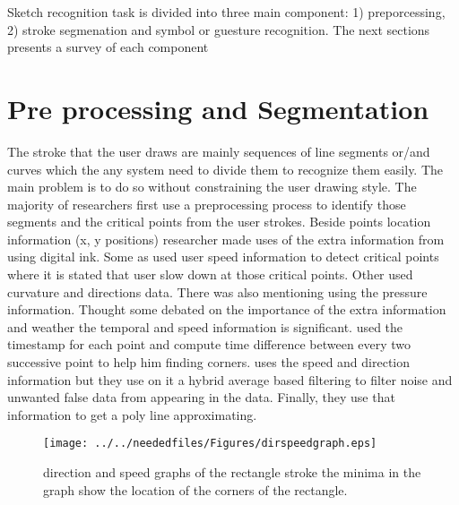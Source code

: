 
Sketch recognition task is divided into three main component: 1) preporcessing, 2) stroke segmenation and symbol or guesture recognition. The next sections presents a survey of each component
  

\section{Pre processing and Segmentation}
\label {sec:preprocessing}
 
The stroke that the user draws are mainly sequences of line segments or/and curves which the any system need to divide them to recognize them easily. The main problem is to do so without constraining the user drawing style. The majority of researchers first use a preprocessing process to identify those segments and the critical points from the user strokes.  
Beside points location information (x, y positions) researcher made uses of the extra information from using digital ink. Some as \cite {mulitstroke5,polygonfeedback31}  used user speed information to detect critical points where it is stated that user slow down at those critical points. Other used curvature and directions data. There was also mentioning using the pressure information.  Thought some \cite {MilitaryCOA37,computationalmodel16,polygonfeedback31}  debated on the importance of the extra information and weather the temporal and speed information is significant.  \cite{polygonfeedback31}  used the timestamp for each point and compute time difference between every two successive point to help him finding corners.
\cite{Overview36} uses the speed and direction information but they use on it a hybrid average based filtering to filter noise and unwanted false data from appearing in the data. Finally, they use that information to get a poly line approximating.
 
 
\begin{figure}
	\centering
		\texttt{[image: ../../neededfiles/Figures/dirspeedgraph.eps]}
	\caption[Direction and Speed]{direction and speed graphs of the rectangle stroke the minima in the graph show the location of the corners of the rectangle.}
	\label{fig:dirspeedgraph}
\end{figure}

